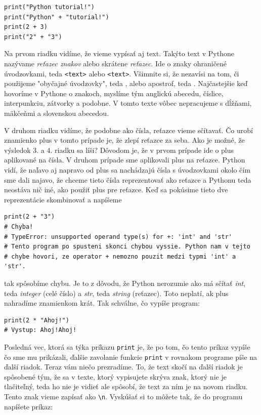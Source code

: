 \documentclass{article}
\begin{document}
\begin{lstlisting}
print("Python tutorial!")
print("Python" + "tutorial!")
print(2 + 3)
print("2" + "3")
\end{lstlisting}

Na prvom riadku vidíme, že vieme vypísať aj text. Takýto text v Pythone nazývame \textit{reťazec znakov} alebo skrátene \textit{reťazec}. Ide o znaky ohraničené úvodzovkami, teda \texttt{\textquotedbl<text>\textquotedbl} alebo \texttt{\textquotesingle<text>\textquotesingle}. Všimnite si, že nezavísi na tom, či použijeme "obyčajné úvodzovky", teda \texttt{\textquotedbl}, alebo apostrof, teda \textquotesingle. Najčastejšie keď hovoríme v Pythone o znakoch, myslíme tým anglickú abecedu, číslice, interpunkciu, zátvorky a podobne. V tomto texte vôbec nepracujeme s dĺžňami, mäkčeňmi a slovenskou abecedou.

V druhom riadku vidíme, že podobne ako čísla, reťazce vieme sčítavať. Čo urobí znamienko plus v tomto prípade je, že zlepí reťazce za seba. Ako je možné, že výsledok 3. a 4. riadku sa líši? Dôvodom je, že v prvom prípade ide o plus aplikované na čísla. V druhom prípade sme aplikovali plus na reťazce. Python vidí, že naľavo aj napravo od plus sa nachádzajú čísla s úvodzovkami okolo čím sme dali najavo, že chceme tieto čísla reprezentovať ako reťazce a Pythonu teda neostáva nič iné, ako použiť plus pre reťazce.
Keď sa pokúsime tieto dve reprezentácie skombinovať a 
napíšeme

\begin{lstlisting}
print(2 + "3")
# Chyba! 
# TypeError: unsupported operand type(s) for +: 'int' and 'str'
# Tento program po spusteni skonci chybou vyssie. Python nam v tejto
# chybe hovori, ze operator + nemozno pouzit medzi typmi 'int' a 'str'.
\end{lstlisting}

tak spôsobíme chybu. Je to z dôvodu, že Python nerozumie ako má sčítať \textit{int}, teda \textit{integer} (celé číslo) a \textit{str}, teda \textit{string} (reťazec). Toto neplatí, ak plus nahradíme znamienkom krát. Tak schválne, čo vypíše program:

\begin{lstlisting}
print(2 * "Ahoj!")
# Vystup: Ahoj!Ahoj!
\end{lstlisting}

Posledná vec, ktorá sa týka príkazu \texttt{print} je, že po tom, čo tento príkaz vypíše čo sme mu prikázali, ďalšie zavolanie funkcie \texttt{print} v rovnakom programe píše na ďalší riadok. Teraz vám niečo prezradíme. To, že text skočí na ďalší riadok je spôsobené tým, že sa v texte, ktorý vypisujete skrýva znak, ktorý nie je tlačiteľný, teda ho nie je vidieť ale spôsobí, že text za ním je na novom riadku. Tento znak vieme zapísať ako \texttt{\textbackslash n}. Vyskúšať si to môžete tak, že do programu napíšete príkaz:
\end{document}
